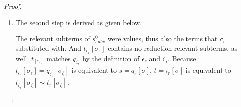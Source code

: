 \begin{lemma}
\begin{proof}
\begin{enumerate}
\item The second step is derived as given below.
\begin{prooftree}
\end{prooftree}
The relevant subterms of $s^0_{subv}$ were values, thus also the terms that $\sigma_\epsilon$ substituted with. And $t_{\epsilon_r}[\sigma_\epsilon]$ contains no reduction-relevant subterms, as well. $t_[\epsilon_r]$ matches $q_{\zeta_r}$ by the definition of $\epsilon_r$ and $\zeta_r$. Because $t_{\epsilon_r}[\sigma_\epsilon] = q_{\zeta_r}[\sigma_\zeta]$ is equivalent to $s = q_r[\sigma]$, $t = t_r[\sigma]$ is equivalent to $t_{\zeta_r}[\sigma_\zeta] \sim t_r[\sigma_\zeta]$.

\end{enumerate}

\end{proof}

\end{lemma}

